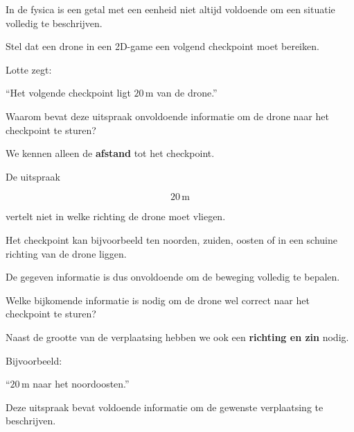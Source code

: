 \documentclass{ximera}
\begin{document}


In de fysica is een getal met een eenheid niet altijd voldoende om een
situatie volledig te beschrijven.

Stel dat een drone in een 2D-game een volgend checkpoint moet bereiken.

\begin{voorbeeld}

Lotte zegt:

\begin{center}
``Het volgende checkpoint ligt $20\,\si{\meter}$ van de drone.''
\end{center}

\begin{question}
Waarom bevat deze uitspraak onvoldoende informatie om de drone naar het
checkpoint te sturen?

\begin{oplossing}
We kennen alleen de \textbf{afstand} tot het checkpoint.

De uitspraak

\[
20\,\si{\meter}
\]

vertelt niet in welke richting de drone moet vliegen.

Het checkpoint kan bijvoorbeeld ten noorden, zuiden, oosten of in een
schuine richting van de drone liggen.

De gegeven informatie is dus onvoldoende om de beweging volledig te bepalen.
\end{oplossing}
\end{question}


\begin{question}
Welke bijkomende informatie is nodig om de drone wel correct naar het
checkpoint te sturen?

\begin{oplossing}
Naast de grootte van de verplaatsing hebben we ook een
\textbf{richting en zin} nodig.

Bijvoorbeeld:

\begin{center}
``$20\,\si{\meter}$ naar het noordoosten.''
\end{center}

Deze uitspraak bevat voldoende informatie om de gewenste verplaatsing te
beschrijven.
\end{oplossing}
\end{question}



\end{voorbeeld}
\end{document}
